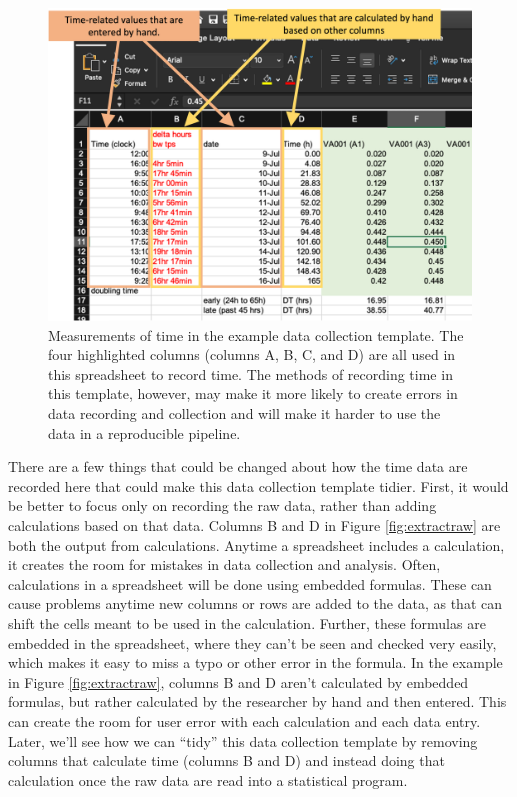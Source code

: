 \documentclass[]{tufte-book}
\begin{document}
\begin{figure}
\includegraphics[width=\textwidth]{figures/growth_curve_time_measures} \caption[Measurements of time in the example data collection template]{Measurements of time in the example data collection template. The four highlighted columns (columns A, B, C, and D) are all used in this spreadsheet to record time. The methods of recording time in this template, however, may make it more likely to create errors in data recording and collection and will make it harder to use the data in a reproducible pipeline.}\label{fig:timemeasures}
\end{figure}

There are a few things that could be changed about how the time data are
recorded here that could make this data collection template tidier. First, it
would be better to focus only on recording the raw data, rather than adding
calculations based on that data. Columns B and D in Figure \ref{fig:extractraw}
are both the output from calculations. Anytime a spreadsheet includes a
calculation, it creates the room for mistakes in data collection and analysis.
Often, calculations in a spreadsheet will be done using embedded formulas. These
can cause problems anytime new columns or rows are added to the data, as that
can shift the cells meant to be used in the calculation. Further, these formulas
are embedded in the spreadsheet, where they can't be seen and checked very
easily, which makes it easy to miss a typo or other error in the formula. In the
example in Figure \ref{fig:extractraw}, columns B and D aren't calculated by
embedded formulas, but rather calculated by the researcher by hand and then
entered. This can create the room for user error with each calculation and each
data entry. Later, we'll see how we can ``tidy'' this data collection template by
removing columns that calculate time (columns B and D) and instead doing that
calculation once the raw data are read into a statistical program.
\end{document}
